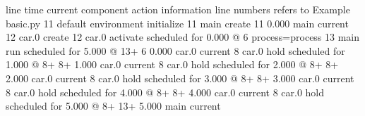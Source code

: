 \documentclass[letterpaper,10pt,english]{sphinxmanual}
\begin{document}
%
\begin{sphinxVerbatim}[commandchars=\\\{\}]
line\PYGZsh{}         time current component    action                               information
\PYGZhy{}\PYGZhy{}\PYGZhy{}\PYGZhy{}\PYGZhy{}   \PYGZhy{}\PYGZhy{}\PYGZhy{}\PYGZhy{}\PYGZhy{}\PYGZhy{}\PYGZhy{}\PYGZhy{}\PYGZhy{}\PYGZhy{} \PYGZhy{}\PYGZhy{}\PYGZhy{}\PYGZhy{}\PYGZhy{}\PYGZhy{}\PYGZhy{}\PYGZhy{}\PYGZhy{}\PYGZhy{}\PYGZhy{}\PYGZhy{}\PYGZhy{}\PYGZhy{}\PYGZhy{}\PYGZhy{}\PYGZhy{}\PYGZhy{}\PYGZhy{}\PYGZhy{} \PYGZhy{}\PYGZhy{}\PYGZhy{}\PYGZhy{}\PYGZhy{}\PYGZhy{}\PYGZhy{}\PYGZhy{}\PYGZhy{}\PYGZhy{}\PYGZhy{}\PYGZhy{}\PYGZhy{}\PYGZhy{}\PYGZhy{}\PYGZhy{}\PYGZhy{}\PYGZhy{}\PYGZhy{}\PYGZhy{}\PYGZhy{}\PYGZhy{}\PYGZhy{}\PYGZhy{}\PYGZhy{}\PYGZhy{}\PYGZhy{}\PYGZhy{}\PYGZhy{}\PYGZhy{}\PYGZhy{}\PYGZhy{}\PYGZhy{}\PYGZhy{}\PYGZhy{}  \PYGZhy{}\PYGZhy{}\PYGZhy{}\PYGZhy{}\PYGZhy{}\PYGZhy{}\PYGZhy{}\PYGZhy{}\PYGZhy{}\PYGZhy{}\PYGZhy{}\PYGZhy{}\PYGZhy{}\PYGZhy{}\PYGZhy{}\PYGZhy{}\PYGZhy{}\PYGZhy{}\PYGZhy{}\PYGZhy{}\PYGZhy{}\PYGZhy{}\PYGZhy{}\PYGZhy{}\PYGZhy{}\PYGZhy{}\PYGZhy{}\PYGZhy{}\PYGZhy{}\PYGZhy{}\PYGZhy{}\PYGZhy{}\PYGZhy{}\PYGZhy{}\PYGZhy{}\PYGZhy{}\PYGZhy{}\PYGZhy{}\PYGZhy{}\PYGZhy{}\PYGZhy{}\PYGZhy{}\PYGZhy{}\PYGZhy{}\PYGZhy{}\PYGZhy{}\PYGZhy{}\PYGZhy{}
                                        line numbers refers to               Example \PYGZhy{} basic.py
   11                                   default environment initialize
   11                                   main create
   11        0.000 main                 current
   12                                   car.0 create
   12                                   car.0 activate                       scheduled for      0.000 @    6  process=process
   13                                   main run                             scheduled for      5.000 @   13+
    6        0.000 car.0                current
    8                                   car.0 hold                           scheduled for      1.000 @    8+
    8+       1.000 car.0                current
    8                                   car.0 hold                           scheduled for      2.000 @    8+
    8+       2.000 car.0                current
    8                                   car.0 hold                           scheduled for      3.000 @    8+
    8+       3.000 car.0                current
    8                                   car.0 hold                           scheduled for      4.000 @    8+
    8+       4.000 car.0                current
    8                                   car.0 hold                           scheduled for      5.000 @    8+
   13+       5.000 main                 current
\end{sphinxVerbatim}
\end{document}
